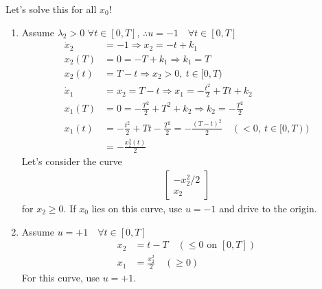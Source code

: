 Let's solve this for all $x_0$!
\begin{enumerate}[label=\roman*)]
\item Assume $\lambda_2>0$ $\forall t\in[0,T]$, $\therefore u = -1 \quad \forall t\in[0,T]$
  \begin{align}
    \dot x_2 &= -1 \Longrightarrow x_2 = -t + k_1 \\
    x_2(T) &= 0 = -T + k_1 \Longrightarrow k_1 = T \\
    x_2(t) &= T - t \Longrightarrow x_2 > 0,\ t\in[0,T) \\
    \dot x_1 &= x_2 = T - t \Longrightarrow x_1 = -\frac{t^2}{2} + Tt + k_2 \\
    x_1(T) &= 0 = -\frac{T^2}{2} + T^2 + k_2 \Longrightarrow k_2 = -\frac{T^2}{2} \\
    x_1(t) &= -\frac{t^2}{2} + Tt - \frac{T^2}{2} = -\frac{(T-t)^2}{2} \quad (<0,\ t\in[0,T)) \\
           &= -\frac{x_2^2(t)}{2}
  \end{align}
  Let's consider the curve
  \begin{gather}
    \begin{bmatrix}
      -x_2^2/2 \\ x_2
    \end{bmatrix}
  \end{gather}
  for $x_2\ge 0$. If $x_0$ lies on this curve, use $u=-1$ and drive to the origin.

\item Assume $u=+1 \quad \forall t\in[0,T]$
  \begin{align}
    x_2 &= t - T \quad (\le 0 \text{ on } [0,T]) \\
    x_1 &= \frac{x_2^2}{2} \quad (\ge 0)
  \end{align}
  For this curve, use $u=+1$.
\end{enumerate}

\begin{center}
\end{center}

